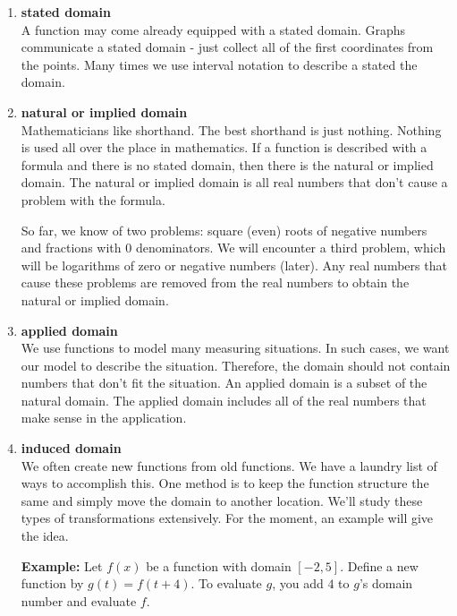 \documentclass{ximera}
\begin{document}
\begin{enumerate}
\item  \textbf{\textcolor{green!50!black}{stated domain}}   \\
A function may come already equipped with a stated domain.  Graphs communicate a stated domain - just collect all of the first coordinates from the points. Many times we use interval notation to describe a stated the domain.


\item  \textbf{\textcolor{green!50!black}{natural or implied domain}}   \\
Mathematicians like shorthand. The best shorthand is just nothing.  Nothing is used all over the place in mathematics. If a function is described with a formula and there is no stated domain, then there is the natural or implied domain.  The natural or implied domain is all real numbers that don't cause a problem with the formula.

So far, we know of two problems: square (even) roots of negative numbers and fractions with $0$ denominators.  We will encounter a third problem, which will be logarithms of zero or negative numbers (later). Any real numbers that cause these problems are removed from the real numbers to obtain the natural or implied domain.


\item  \textbf{\textcolor{green!50!black}{applied domain}}   \\
We use functions to model many measuring situations. In such cases, we want our model to describe the situation.  Therefore, the domain should not contain numbers that don't fit the situation. An applied domain is a subset of the natural domain.  The applied domain includes all of the real numbers that make sense in the application.


\item \textbf{\textcolor{green!50!black}{induced domain}}  \\
We often create new functions from old functions. We have a laundry list of ways to accomplish this.  One method is to keep the function structure the same and simply move the domain to another location. We'll study these types of transformations extensively. For the moment, an example will give the idea. 







\textbf{Example:}  Let $f(x)$ be a function with domain $[-2, 5]$.  Define a new function by $g(t) = f(t+4)$.  To evaluate $g$, you add $4$ to $g$'s domain number and evaluate $f$.  


\end{enumerate}
\end{document}
